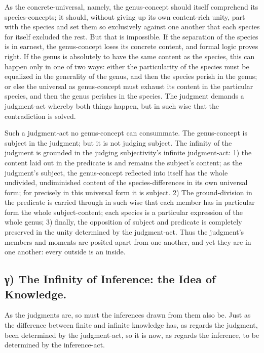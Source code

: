 \documentclass[12pt]{book}
\begin{document}
As the concrete-universal, namely, the genus-concept should
itself comprehend its species-concepts; it should, without giving up
its own content-rich unity, part with the species and set them so
exclusively against one another that each species for itself
excluded the rest. But that is impossible. If the separation of the
species is in earnest, the genus-concept loses its concrete content,
and formal logic proves right. If the genus is absolutely to have
the same content as the species, this can happen only in one of two
ways: either the particularity of the species must be equalized in
the generality of the genus, and then the species perish in the
genus; or else the universal as genus-concept must exhaust its
content in the particular species, and then the genus perishes in
the species. The judgment demands a judgment-act whereby both things
happen, but in such wise that the contradiction is solved.

Such a judgment-act no genus-concept can consummate. The
genus-concept is subject in the judgment; but it is not judging
subject. The infinity of the judgment is grounded in the judging
subjectivity's infinite judgment-act: 1) the content laid out in the
predicate is and remains the subject's content; as the judgment's
subject, the genus-concept reflected into itself has the whole
undivided, undiminished content of the species-differences in its
own universal form; for precisely in this universal form it is
subject. 2) The ground-division in the predicate is carried through
in such wise that each member has in particular form the whole
subject-content; each species is a particular expression of the
whole genus; 3) finally, the opposition of subject and predicate is
completely preserved in the unity determined by the judgment-act.
Thus the judgment's members and moments are posited apart from one
another, and yet they are in one another: every outside is an
inside.

\subsection*{γ) The Infinity of Inference: the Idea of Knowledge.}

As the judgments are, so must the inferences drawn from them also
be. Just as the difference between finite and infinite knowledge
has, as regards the judgment, been determined by the
judgment-act, so it is now, as regards the inference, to be
determined by the inference-act.
\end{document}
